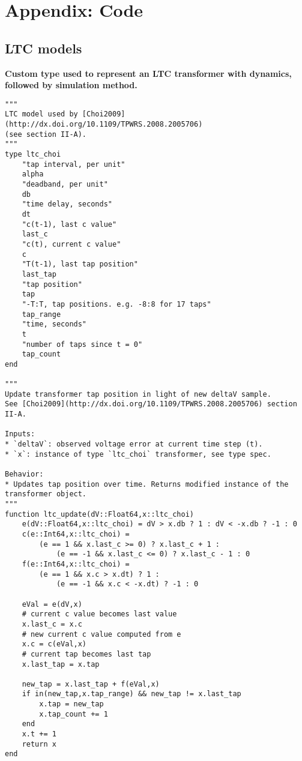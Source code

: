 \documentclass[10pt,letterpaper]{article}
\begin{document}



\clearpage
\section{Appendix: Code}
\subsection{LTC models}\label{sec:julia-ltc}
\textbf{Custom type used to represent an LTC transformer with \cite{choi2009} dynamics, followed by simulation method.}
\begin{verbatim}
"""
LTC model used by [Choi2009](http://dx.doi.org/10.1109/TPWRS.2008.2005706)
(see section II-A).
"""
type ltc_choi
    "tap interval, per unit"
    alpha
    "deadband, per unit"
    db
    "time delay, seconds"
    dt
    "c(t-1), last c value"
    last_c
    "c(t), current c value"
    c
    "T(t-1), last tap position"
    last_tap
    "tap position"
    tap
    "-T:T, tap positions. e.g. -8:8 for 17 taps"
    tap_range
    "time, seconds"
    t
    "number of taps since t = 0"
    tap_count
end

"""
Update transformer tap position in light of new deltaV sample.
See [Choi2009](http://dx.doi.org/10.1109/TPWRS.2008.2005706) section II-A.

Inputs:
* `deltaV`: observed voltage error at current time step (t).
* `x`: instance of type `ltc_choi` transformer, see type spec.

Behavior:
* Updates tap position over time. Returns modified instance of the transformer object.
"""
function ltc_update(dV::Float64,x::ltc_choi)
    e(dV::Float64,x::ltc_choi) = dV > x.db ? 1 : dV < -x.db ? -1 : 0
    c(e::Int64,x::ltc_choi) =
        (e == 1 && x.last_c >= 0) ? x.last_c + 1 :
            (e == -1 && x.last_c <= 0) ? x.last_c - 1 : 0
    f(e::Int64,x::ltc_choi) =
        (e == 1 && x.c > x.dt) ? 1 :
            (e == -1 && x.c < -x.dt) ? -1 : 0

    eVal = e(dV,x)
    # current c value becomes last value
    x.last_c = x.c
    # new current c value computed from e
    x.c = c(eVal,x)
    # current tap becomes last tap
    x.last_tap = x.tap

    new_tap = x.last_tap + f(eVal,x)
    if in(new_tap,x.tap_range) && new_tap != x.last_tap
        x.tap = new_tap
        x.tap_count += 1
    end
    x.t += 1
    return x
end
\end{verbatim}
\end{document}
